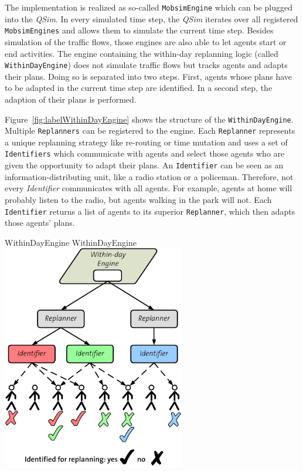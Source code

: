 
The implementation is realized as so-called \lstinline{MobsimEngine} which can be plugged into the \emph{QSim}. In every simulated time step, the \emph{QSim} iterates over all registered \lstinline{MobsimEngines} and allows them to simulate the current time step. Besides simulation of the traffic flows, those engines are also able to let agents start or end activities. The engine containing the within-day replanning logic (called \lstinline{WithinDayEngine}) does not simulate traffic flows but tracks agents and adapts their plans. Doing so is separated into two steps. First, agents whose plans have to be adapted in the current time step are identified. In a second step, the adaption of their plans is performed. 


Figure~\ref{fig:labelWithinDayEngine} shows the structure of the \lstinline{WithinDayEngine}. Multiple \lstinline{Replanners} can be registered to the engine. Each \lstinline{Replanner} represents a unique replanning strategy like re-routing or time mutation and uses a set of \lstinline{Identifiers} which communicate with agents and select those agents who are given the opportunity to adapt their plans. An \lstinline{Identifier} can be seen as an information-distributing unit, like a radio station or a policeman. Therefore, not every \emph{Identifier} communicates with all agents. For example, agents at home will probably listen to the radio, but agents walking in the park will not. Each \lstinline{Identifier} returns a list of agents to its superior \lstinline{Replanner}, which then adapts those agents' plans.

\createfigure%
{WithinDayEngine}%
{WithinDayEngine}%
{\label{fig:labelWithinDayEngine}}%
{\includegraphics[width=8.0cm, angle=0]{extending/figures/WithinDayReplanning/ReplanningManager}}%
{}


